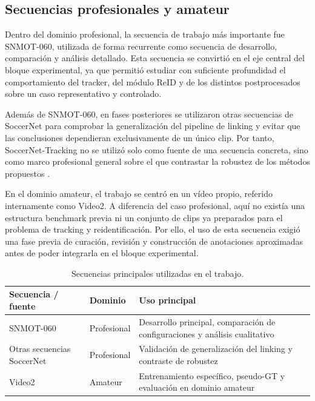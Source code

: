 \documentclass[../MAIN.tex]{subfiles}
\begin{document}
	\subsection{Secuencias profesionales y amateur}
	
	Dentro del dominio profesional, la secuencia de trabajo más importante fue SNMOT-060, utilizada de forma recurrente como secuencia de desarrollo, comparación y análisis detallado. Esta secuencia se convirtió en el eje central del bloque experimental, ya que permitió estudiar con suficiente profundidad el comportamiento del tracker, del módulo ReID y de los distintos postprocesados sobre un caso representativo y controlado.
	
	Además de SNMOT-060, en fases posteriores se utilizaron otras secuencias de SoccerNet para comprobar la generalización del pipeline de linking y evitar que las conclusiones dependieran exclusivamente de un único clip. Por tanto, SoccerNet-Tracking no se utilizó solo como fuente de una secuencia concreta, sino como marco profesional general sobre el que contrastar la robustez de los métodos propuestos \parencite{soccernet_tracking_repo}.
	
	En el dominio amateur, el trabajo se centró en un vídeo propio, referido internamente como Video2. A diferencia del caso profesional, aquí no existía una estructura benchmark previa ni un conjunto de clips ya preparados para el problema de tracking y reidentificación. Por ello, el uso de esta secuencia exigió una fase previa de curación, revisión y construcción de anotaciones aproximadas antes de poder integrarla en el bloque experimental.
	
	\begin{table}[H]
		\centering
		\caption{Secuencias principales utilizadas en el trabajo.}
		\label{tab:cap4_secuencias}
		\begin{tabular}{p{3.2cm}p{3.5cm}p{5.8cm}}
			\toprule
			\textbf{Secuencia / fuente} & \textbf{Dominio} & \textbf{Uso principal} \\
			\midrule
			SNMOT-060 & Profesional & Desarrollo principal, comparación de configuraciones y análisis cualitativo \\
			Otras secuencias SoccerNet & Profesional & Validación de generalización del linking y contraste de robustez \\
			Video2 & Amateur & Entrenamiento específico, pseudo-GT y evaluación en dominio amateur \\
			\bottomrule
		\end{tabular}
	\end{table}
	
\end{document}
